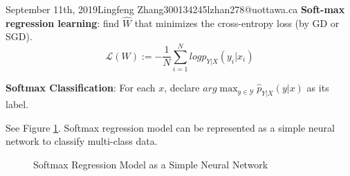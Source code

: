 \documentclass{article}
\begin{document}
\begin{lecture}{September 11th, 2019}{Lingfeng Zhang}{300134245}{lzhan278@uottawa.ca}
            \textbf{Soft-max regression learning}: find $\hat{W}$ that minimizes the cross-entropy loss (by GD or SGD).
            \[
                \mathcal{L}(W) := - \frac{1}{N} \sum_{i=1}^N log p_{Y|X} (y_i|x_i)
            \]

\textbf{Softmax Classification}: For each $x$, declare $arg\max_{y \in \mathcal{Y}} \hat{p}_{Y|X} (y|x)$ as its label.

See Figure \ref{fig:softmaxNN}. Softmax regression model can be represented as a simple neural network to classify multi-class data.

\begin{figure}[ht!]
\centering
{}
\caption{Softmax Regression Model as a Simple Neural Network}
\label{fig:softmaxNN}
\end{figure}


\end{lecture}
\end{document}
